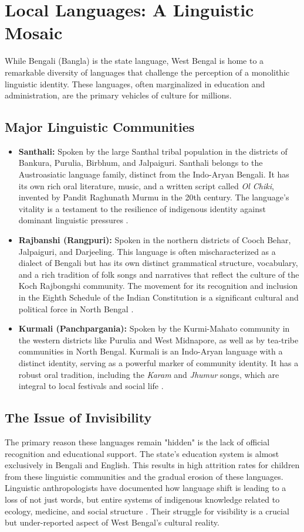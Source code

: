 \documentclass{article}
\begin{document}
\section{Local Languages: A Linguistic Mosaic}
While Bengali (Bangla) is the state language, West Bengal is home to a remarkable diversity of languages that challenge the perception of a monolithic linguistic identity. These languages, often marginalized in education and administration, are the primary vehicles of culture for millions.

\subsection{Major Linguistic Communities}
\begin{itemize}
    \item \textbf{Santhali:} Spoken by the large Santhal tribal population in the districts of Bankura, Purulia, Birbhum, and Jalpaiguri. Santhali belongs to the Austroasiatic language family, distinct from the Indo-Aryan Bengali. It has its own rich oral literature, music, and a written script called \textit{Ol Chiki}, invented by Pandit Raghunath Murmu in the 20th century. The language's vitality is a testament to the resilience of indigenous identity against dominant linguistic pressures \cite{isara2016}.
    \item \textbf{Rajbanshi (Rangpuri):} Spoken in the northern districts of Cooch Behar, Jalpaiguri, and Darjeeling. This language is often mischaracterized as a dialect of Bengali but has its own distinct grammatical structure, vocabulary, and a rich tradition of folk songs and narratives that reflect the culture of the Koch Rajbongshi community. The movement for its recognition and inclusion in the Eighth Schedule of the Indian Constitution is a significant cultural and political force in North Bengal \cite{tunga2017}.
    \item \textbf{Kurmali (Panchpargania):} Spoken by the Kurmi-Mahato community in the western districts like Purulia and West Midnapore, as well as by tea-tribe communities in North Bengal. Kurmali is an Indo-Aryan language with a distinct identity, serving as a powerful marker of community identity. It has a robust oral tradition, including the \textit{Karam} and \textit{Jhumur} songs, which are integral to local festivals and social life \cite{basu2010}.
\end{itemize}

\subsection{The Issue of Invisibility}
The primary reason these languages remain "hidden" is the lack of official recognition and educational support. The state's education system is almost exclusively in Bengali and English. This results in high attrition rates for children from these linguistic communities and the gradual erosion of these languages. Linguistic anthropologists have documented how language shift is leading to a loss of not just words, but entire systems of indigenous knowledge related to ecology, medicine, and social structure \cite{mohanty2009}. Their struggle for visibility is a crucial but under-reported aspect of West Bengal's cultural reality.
\end{document}
